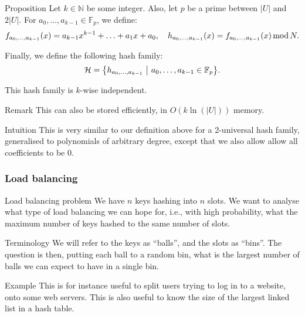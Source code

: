 \documentclass[a4paper]{article}
\begin{document}
\begin{parag}{Proposition}
    Let $k \in \mathbb{N}$ be some integer. Also, let $p$ be a prime between $\left|U\right|$ and $2\left|U\right|$. For $a_0, \ldots, a_{k-1} \in \mathbb{F}_p$, we define: 
    \[f_{a_0, \ldots, a_{k-1}}\left(x\right) = a_{k-1}x^{k-1} + \ldots + a_1 x + a_0, \mathspace h_{a_0, \ldots, a_{k-1}}\left(x\right) = f_{a_0, \ldots, a_{k-1}}\left(x\right) \Mod N.\]
   
    Finally, we define the following hash family: 
    \[\mathcal{H} = \left\{h_{a_0, \ldots, a_{k-1}} \suchthat a_0, \ldots, a_{k-1} \in \mathbb{F}_p\right\}.\]
    
    This hash family is $k$-wise independent.

    \begin{subparag}{Remark}
        This can also be stored efficiently, in $O\left(k\ln\left(\left|U\right|\right)\right)$ memory.
    \end{subparag}

    \begin{subparag}{Intuition}
        This is very similar to our definition above for a 2-universal hash family, generalised to polynomials of arbitrary degree, except that we also allow allow all coefficients to be $0$.
    \end{subparag}
\end{parag}

\subsubsection{Load balancing}

\begin{parag}{Load balancing problem}
    We have $n$ keys hashing into $n$ slots. We want to analyse what type of load balancing we can hope for, i.e., with high probability, what the maximum number of keys hashed to the same number of slots.

    \begin{subparag}{Terminology}
        We will refer to the keys as ``balls'', and the slots as ``bins''. The question is then, putting each ball to a random bin, what is the largest number of balls we can expect to have in a single bin. 
    \end{subparag}

    \begin{subparag}{Example}
        This is for instance useful to split users trying to log in to a website, onto some web servers. This is also useful to know the size of the largest linked list in a hash table.
    \end{subparag}
\end{parag}
\end{document}
